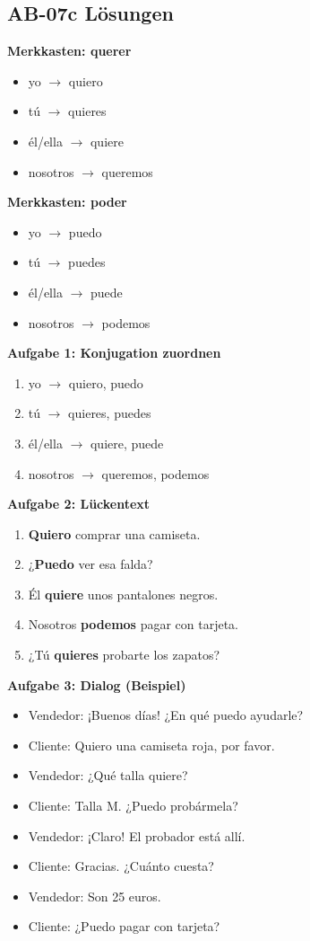 \documentclass[11pt,a4paper]{article}
\begin{document}
\subsection{AB-07c Lösungen}

\textbf{Merkkasten: querer}
\begin{itemize}
    \item yo $\rightarrow$ quiero
    \item tú $\rightarrow$ quieres
    \item él/ella $\rightarrow$ quiere
    \item nosotros $\rightarrow$ queremos
\end{itemize}

\textbf{Merkkasten: poder}
\begin{itemize}
    \item yo $\rightarrow$ puedo
    \item tú $\rightarrow$ puedes
    \item él/ella $\rightarrow$ puede
    \item nosotros $\rightarrow$ podemos
\end{itemize}

\textbf{Aufgabe 1: Konjugation zuordnen}
\begin{enumerate}[label=\alph*)]
    \item yo $\rightarrow$ quiero, puedo
    \item tú $\rightarrow$ quieres, puedes
    \item él/ella $\rightarrow$ quiere, puede
    \item nosotros $\rightarrow$ queremos, podemos
\end{enumerate}

\textbf{Aufgabe 2: Lückentext}
\begin{enumerate}[label=\alph*)]
    \item \textbf{Quiero} comprar una camiseta.
    \item ¿\textbf{Puedo} ver esa falda?
    \item Él \textbf{quiere} unos pantalones negros.
    \item Nosotros \textbf{podemos} pagar con tarjeta.
    \item ¿Tú \textbf{quieres} probarte los zapatos?
\end{enumerate}

\textbf{Aufgabe 3: Dialog (Beispiel)}
\begin{itemize}
    \item Vendedor: ¡Buenos días! ¿En qué puedo ayudarle?
    \item Cliente: Quiero una camiseta roja, por favor.
    \item Vendedor: ¿Qué talla quiere?
    \item Cliente: Talla M. ¿Puedo probármela?
    \item Vendedor: ¡Claro! El probador está allí.
    \item Cliente: Gracias. ¿Cuánto cuesta?
    \item Vendedor: Son 25 euros.
    \item Cliente: ¿Puedo pagar con tarjeta?
\end{itemize}
\end{document}
